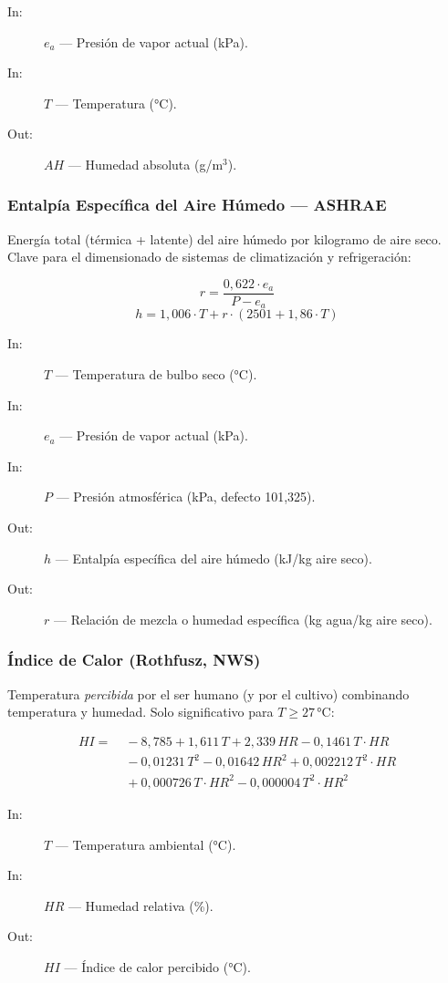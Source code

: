 \begin{description}
        \item [In:] $e_a$ — Presión de vapor actual (kPa).
    \item [In:] $T$ — Temperatura (°C).
    \item [Out:] $AH$ — Humedad absoluta (g/m$^3$).
\end{description}

\subsubsection{Entalpía Específica del Aire Húmedo — ASHRAE}

Energía total (térmica + latente) del aire húmedo por kilogramo de aire seco.
Clave para el dimensionado de sistemas de climatización y refrigeración:

\[
r = \frac{0{,}622 \cdot e_a}{P - e_a}
\]
\[
h = 1{,}006 \cdot T + r \cdot (2501 + 1{,}86 \cdot T)
\]

\begin{description}
        \item [In:] $T$ — Temperatura de bulbo seco (°C).
    \item [In:] $e_a$ — Presión de vapor actual (kPa).
    \item [In:] $P$ — Presión atmosférica (kPa, defecto 101,325).
    \item [Out:] $h$ — Entalpía específica del aire húmedo (kJ/kg aire seco).
    \item [Out:] $r$ — Relación de mezcla o humedad específica (kg agua/kg aire seco).
\end{description}

\subsubsection{Índice de Calor (Rothfusz, NWS)}

Temperatura \textit{percibida} por el ser humano (y por el cultivo) combinando temperatura
y humedad. Solo significativo para $T \geq 27$\,°C:

\begin{align*}
HI = &\;-8{,}785 + 1{,}611\,T + 2{,}339\,HR - 0{,}1461\,T\cdot HR \\
     &\; -0{,}01231\,T^2 - 0{,}01642\,HR^2 + 0{,}002212\,T^2\cdot HR \\
     &\; +0{,}000726\,T\cdot HR^2 - 0{,}000004\,T^2\cdot HR^2
\end{align*}

\begin{description}
        \item [In:] $T$ — Temperatura ambiental (°C).
    \item [In:] $HR$ — Humedad relativa (\%).
    \item [Out:] $HI$ — Índice de calor percibido (°C).
\end{description}

